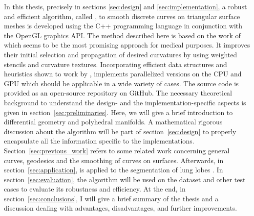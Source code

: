 \documentclass{stdlocal}
\begin{document}
In this thesis, precisely in sections \ref{sec:design} and \ref{sec:implementation}, a robust and efficient algorithm, called , to smooth discrete curves on triangular surface meshes is developed using the C++ programming language in conjunction with the OpenGL graphics API.
The method described here is based on the work of \textcite{lawonn2014} which seems to be the most promising approach for medical purposes.
It improves their initial selection and propagation of desired curvatures by using weighted stencils and curvature textures.
Incorporating efficient data structures and heuristics shown to work by \textcite{mancinelli2022},  implements parallelized versions on the CPU and GPU which should be applicable in a wide variety of cases.
The source code is provided as an open-source repository on GitHub.
The necessary theoretical background to understand the design- and the implementation-specific aspects is given in section~\ref{sec:preliminaries}.
Here, we will give a brief introduction to differential geometry and polyhedral manifolds.
A mathematical rigorous discussion about the algorithm will be part of section~\ref{sec:design} to properly encapsulate all the information specific to the implementations.
Section~\ref{sec:previous_work} refers to some related work concerning general curves, geodesics and the smoothing of curves on surfaces.
Afterwards, in section~\ref{sec:application},  is applied to the segmentation of lung lobes \autocite{park2019}.
In section~\ref{sec:evaluation}, the algorithm will be used on the  dataset and other test cases to evaluate its robustness and efficiency.
At the end, in section~\ref{sec:conclusions}, I will give a brief summary of the thesis and a discussion dealing with advantages, disadvantages, and further improvements.

\end{document}

